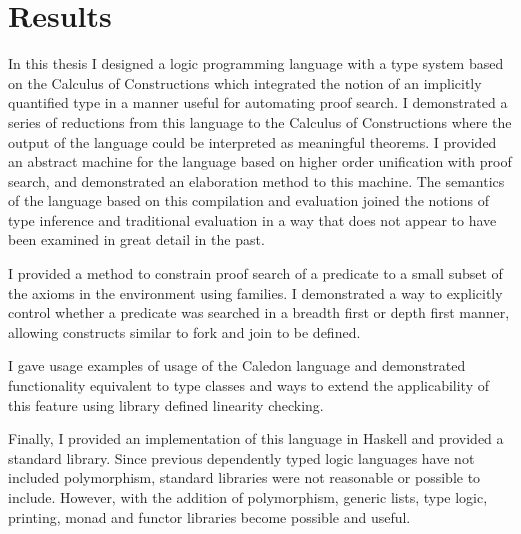 \section{Results}

In this thesis I designed a logic programming language with a type system based on the
Calculus of Constructions which integrated the notion of an implicitly quantified type in
a manner useful for automating proof search. I demonstrated a series of reductions from
this language to the Calculus of Constructions where the output of the language could
be interpreted as meaningful theorems. I provided an abstract machine for the language
based on higher order unification with proof search, and demonstrated an elaboration
method to this machine. The semantics of the language based on this compilation and
evaluation joined the notions of type inference and traditional evaluation in a way that
does not appear to have been examined in great detail in the past.

I provided a method to constrain proof search of a predicate to a small subset of the
axioms in the environment using families. I demonstrated a way to explicitly control
whether a predicate was searched in a breadth first or depth first manner, allowing
constructs similar to fork and join to be defined.

I gave usage examples of usage of the Caledon language and demonstrated functionality
equivalent to type classes and ways to extend the applicability of this feature using library defined linearity checking.  

Finally, I provided an implementation of this language in Haskell and provided a
standard library. Since previous dependently typed logic languages have not included
polymorphism, standard libraries were not reasonable or possible to include. However,
with the addition of polymorphism, generic lists, type logic, printing, monad and
functor libraries become possible and useful.
